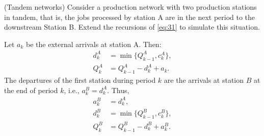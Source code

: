 \begin{exercise}(Tandem  networks) 
  Consider a production network with two production stations in
  tandem, that is, the jobs processed by station A are in the next
  period to the downstream Station B.  Extend the recursions of
  \eqref{eq:31} to simulate this situation.
\begin{solution}
  Let $a_k$ be the external arrivals at station A. Then:
\begin{equation}
  \begin{split}
    d^A_k &= \min\{Q_{k-1}^A, c_k^A\}, \\
    Q_k^A &= Q_{k-1}^A -d_k^A + a_k.
  \end{split}
\end{equation}
The departures of the first station during period $k$ are the arrivals
at station $B$ at the end of period $k$, i.e., $a_k^B =
d_{k}^A$. Thus,
\begin{equation}
  \begin{split}
    a_k^B &= d_{k}^A,\\
    d^B_k &= \min\{Q_{k-1}^B, c_k^B\}, \\
    Q_k^B &= Q_{k-1}^B -d_k^B + a_k^B.
  \end{split}
\end{equation}
\end{solution}
\end{exercise}

